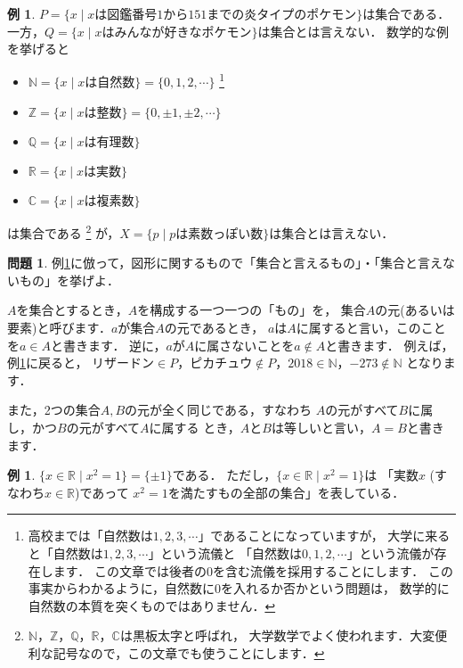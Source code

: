 \documentclass[./main]{subfiles} %
\theoremstyle{definition}
\newtheorem{hamadaex}[hamadadefi]{例}
\newtheorem{hamadaqst}[hamadadefi]{問題}
\begin{document}
\begin{hamadaex}
\label{shugo}
$P=\{x\mid xは図鑑番号1から151までの炎タイプのポケモン\}$は集合である．
一方，$Q=\{x\mid xはみんなが好きなポケモン\}$は集合とは言えない．
数学的な例を挙げると
\begin{itemize}
\item $\mathbb{N}=\{x\mid xは自然数\}=\{0,1,2,\cdots\}$
\footnote{高校までは「自然数は$1,2,3,\cdots$」であることになっていますが，
大学に来ると「自然数は$1,2,3,\cdots$」という流儀と
「自然数は$0,1,2,\cdots$」という流儀が存在します．
この文章では後者の0を含む流儀を採用することにします．
この事実からわかるように，自然数に0を入れるか否かという問題は，
数学的に自然数の本質を突くものではありません．}
\item $\mathbb{Z}=\{x\mid xは整数\}=\{0,\pm1,\pm2,\cdots\}$
\item $\mathbb{Q}=\{x\mid xは有理数\}$
\item $\mathbb{R}=\{x\mid xは実数\}$
\item $\mathbb{C}=\{x\mid xは複素数\}$
\end{itemize}
は集合である
\footnote{$\mathbb{N}$，$\mathbb{Z}$，$\mathbb{Q}$，$\mathbb{R}$，$\mathbb{C}$は黒板太字と呼ばれ，
大学数学でよく使われます．大変便利な記号なので，この文章でも使うことにします．}
が，$X=\{p\mid pは素数っぽい数\}$は集合とは言えない．
\end{hamadaex}

\begin{hamadaqst}
\label{shugoq}
例\ref{shugo}に倣って，図形に関するもので「集合と言えるもの」・「集合と言えないもの」を挙げよ．
\end{hamadaqst}

$A$を集合とするとき，$A$を構成する一つ一つの「もの」を，
集合$A$の元(あるいは要素)と呼びます．$a$が集合$A$の元であるとき，
$a$は$A$に属すると言い，このことを$a\in A$と書きます．
逆に，$a$が$A$に属さないことを$a\notin A$と書きます．
例えば，例\ref{shugo}に戻ると，
$リザードン\in P$，$ピカチュウ\notin P$，$2018\in\mathbb{N}$，$-273\notin\mathbb{N}$
となります．

また，2つの集合$A,B$の元が全く同じである，すなわち
$A$の元がすべて$B$に属し，かつ$B$の元がすべて$A$に属する
とき，$A$と$B$は等しいと言い，$A=B$と書きます．

\begin{hamadaex}
$\{x\in\mathbb{R}\mid x^2=1\}=\{\pm1\}$である．
ただし，$\{x\in\mathbb{R}\mid x^2=1\}$は
「実数$x$ (すなわち$x\in\mathbb{R}$)であって
$x^2=1$を満たすもの全部の集合」を表している．
\end{hamadaex}
\end{document}
